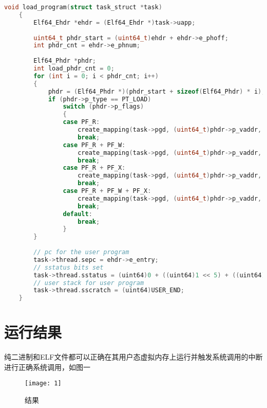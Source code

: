 \documentclass{source/Report}
\begin{document}
\begin{lstlisting}[language = c, title = {load\_program}]
    void load_program(struct task_struct *task)
    {
        Elf64_Ehdr *ehdr = (Elf64_Ehdr *)task->uapp;
    
        uint64_t phdr_start = (uint64_t)ehdr + ehdr->e_phoff;
        int phdr_cnt = ehdr->e_phnum;
    
        Elf64_Phdr *phdr;
        int load_phdr_cnt = 0;
        for (int i = 0; i < phdr_cnt; i++)
        {
            phdr = (Elf64_Phdr *)(phdr_start + sizeof(Elf64_Phdr) * i);
            if (phdr->p_type == PT_LOAD)
                switch (phdr->p_flags)
                {
                case PF_R:
                    create_mapping(task->pgd, (uint64_t)phdr->p_vaddr, (uint64)ehdr - (uint64)PA2VA_OFFSET + (uint64)phdr->p_offset, (uint64)phdr->p_memsz, VM_USER_PERM_R);
                    break;
                case PF_R + PF_W:
                    create_mapping(task->pgd, (uint64_t)phdr->p_vaddr, (uint64)ehdr - (uint64)PA2VA_OFFSET + (uint64)phdr->p_offset, (uint64)phdr->p_memsz, VM_USER_PERM_R_W);
                    break;
                case PF_R + PF_X:
                    create_mapping(task->pgd, (uint64_t)phdr->p_vaddr, (uint64)ehdr - (uint64)PA2VA_OFFSET + (uint64)phdr->p_offset, (uint64)phdr->p_memsz, VM_USER_PERM_R_X);
                    break;
                case PF_R + PF_W + PF_X:
                    create_mapping(task->pgd, (uint64_t)phdr->p_vaddr, (uint64)ehdr - (uint64)PA2VA_OFFSET + (uint64)phdr->p_offset, (uint64)phdr->p_memsz, VM_USER_PERM_R_W_X);
                    break;
                default:
                    break;
                }
        }
    
        // pc for the user program
        task->thread.sepc = ehdr->e_entry;
        // sstatus bits set
        task->thread.sstatus = (uint64)0 + ((uint64)1 << 5) + ((uint64)0 << 8) + ((uint64)1 << 18);
        // user stack for user program
        task->thread.sscratch = (uint64)USER_END;
    }
\end{lstlisting}

\section{运行结果}

纯二进制和ELF文件都可以正确在其用户态虚拟内存上运行并触发系统调用的中断进行正确系统调用，如图一

\begin{figure}[p]
    \centering
    \texttt{[image: 1]}
    \caption{结果}
\end{figure}
\end{document}
